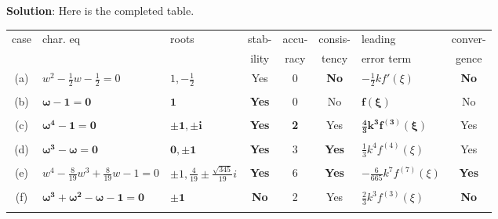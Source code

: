 \documentclass[final,oneside,onecolumn]{article}
\begin{document}
\begin{enumerate}
{\large \bf Solution}: Here is the completed table.
\begin{center}
	\begin{tabular}{|c|l|l|c|c|c|l|c|}
		\hline
		case & char. eq & roots & stab-   & accu- & consis- & leading & conver- \\
		&          &       & ility & racy  & tency   & error term & gence \\
		\hline
		(a)  & $w^2 - \frac{1}{2}w - \frac{1}{2}=0$ & $1,-\frac{1}{2}$ & Yes & 
		0 &\textbf{No}  & $-\frac{1}{2}k f'(\xi)$ &\textbf{No} \\
		& & & & & & & \\
		(b)  &$\boldsymbol{\omega-1=0}$  &$\mathbf{1}$ &\textbf{Yes} & 0 & No  &$\boldsymbol{f(\xi)}$ & No \\
		& & & & & & & \\
		(c)  &$\boldsymbol{\omega^4-1=0}$  &$\mathbf{\pm 1, \pm i}$  &\textbf{Yes}  & \textbf{2} & Yes  & $\boldsymbol{\frac{4}{3}k^3 f^{(3)}(\xi)}$ & Yes \\
		& & & & & & & \\
		(d)  &$\boldsymbol{\omega^3-\omega=0}$  &$\mathbf{0, \pm 1}$  &\textbf{Yes}  & 3 & \textbf{Yes}    & $\frac{1}{3}k^4 f^{(4)}(\xi)$ & Yes \\
		& & & & & & & \\
		(e)  & $w^4 - \frac{8}{19}w^3 + \frac{8}{19}w-1=0$ & $\pm 1,\frac{4}{19}\pm \frac{\sqrt{345}}{19}i$ &\textbf{Yes}  & 
		6 & \textbf{Yes}  & $-\frac{6}{665}k^7 f^{(7)}(\xi)$ & \textbf{Yes} \\
		& & & & & & & \\
		(f)  &$\boldsymbol{\omega^3+\omega^2-\omega-1=0}$  &$\mathbf{\pm 1}$  &\textbf{No}  & 2 & Yes & $\frac{2}{3}k^3 f^{(3)}(\xi)$ & \textbf{No} \\
		& & & & & & & \\
		\hline
	\end{tabular}
\end{center}


\end{enumerate}
\end{document}
